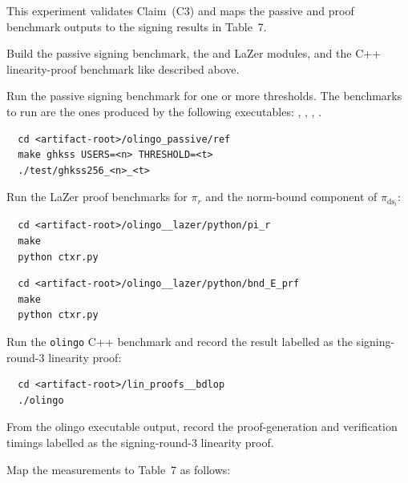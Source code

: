 \documentclass[nonacm,sigconf]{acmart}
\begin{document}
\begin{compactitem}
  This experiment validates Claim~(C3) and maps the passive and proof benchmark outputs to the signing results in Table~7.

  \begin{asparadesc}
    \item[Preparation:] Build the passive signing benchmark, the  and  LaZer modules, and the C++ linearity-proof benchmark like described above.

    \item[Execution:] Run the passive signing benchmark for one or more thresholds.
    The benchmarks to run are the ones produced by the following executables: , , , .

\begin{verbatim}
  cd <artifact-root>/olingo_passive/ref
  make ghkss USERS=<n> THRESHOLD=<t>
  ./test/ghkss256_<n>_<t>
\end{verbatim}

    Run the LaZer proof benchmarks for $\pi_r$ and the norm-bound component of $\pi_{\mathrm{ds}_i}$:

\begin{verbatim}
  cd <artifact-root>/olingo__lazer/python/pi_r
  make
  python ctxr.py
\end{verbatim}

\begin{verbatim}
  cd <artifact-root>/olingo__lazer/python/bnd_E_prf
  make
  python ctxr.py
\end{verbatim}

    Run the \texttt{olingo} C++ benchmark and record the result labelled as the signing-round-3 linearity proof:

\begin{verbatim}
  cd <artifact-root>/lin_proofs__bdlop
  ./olingo
\end{verbatim}

    From the olingo executable output, record the proof-generation and verification timings labelled as the signing-round-3 linearity proof.

    \item[Results:] Map the measurements to Table~7 as follows:


\end{asparadesc}
\end{compactitem}
\end{document}
